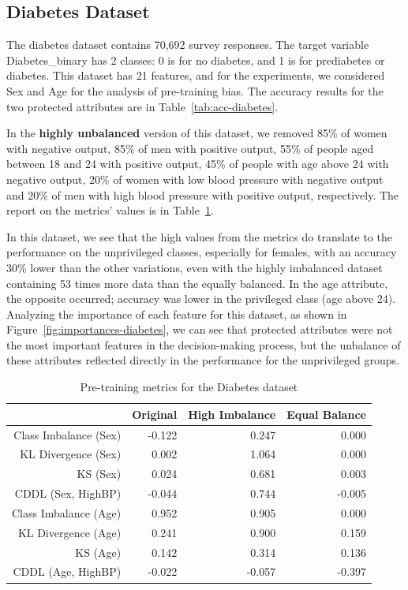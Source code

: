 \documentclass[12pt]{article}
\begin{document}
\subsection{Diabetes Dataset}
\label{sec:diabetes}
The diabetes dataset contains 70,692 survey responses. The target variable Diabetes\_binary has 2 classes: 0 is for no diabetes, and 1 is for prediabetes or diabetes. This dataset has 21 features, and for the experiments, we considered Sex and Age for the analysis of pre-training bias. The accuracy results for the two protected attributes are in Table~\ref{tab:acc-diabetes}.

In the \textbf{highly unbalanced} version of this dataset, we removed 85\% of women with negative output, 85\% of men with positive output, 55\% of people aged between 18 and 24 with positive output, 45\% of people with age above 24 with negative output, 20\% of women with low blood pressure with negative output and 20\% of men with high blood pressure with positive output, respectively. The report on the metrics' values is in Table~\ref{tab:metrics-diabetes}.

In this dataset, we see that the high values from the metrics do translate to the performance on the unprivileged classes, especially for females, with an accuracy 30\% lower than the other variations, even with the highly imbalanced dataset containing 53 times more data than the equally balanced. In the age attribute, the opposite occurred; accuracy was lower in the privileged class (age above 24). Analyzing the importance of each feature for this dataset, as shown in Figure~\ref{fig:importances-diabetes}, we can see that protected attributes were not the most important features in the decision-making process, but the unbalance of these attributes reflected directly in the performance for the unprivileged groups.

\begin{table}[ht]
\centering
\begin{tabular}{@{}rrrr@{}}
\toprule
                      & Original & High Imbalance & Equal Balance \\ \midrule
Class Imbalance (Sex) & -0.122   & 0.247          & 0.000         \\
KL Divergence (Sex)   & 0.002    & 1.064          & 0.000         \\
KS (Sex)              & 0.024    & 0.681          & 0.003         \\
CDDL (Sex, HighBP)    & -0.044   & 0.744          & -0.005        \\
Class Imbalance (Age) & 0.952    & 0.905          & 0.000         \\
KL Divergence (Age)   & 0.241    & 0.900          & 0.159         \\
KS (Age)              & 0.142    & 0.314          & 0.136         \\
CDDL (Age, HighBP)    & -0.022   & -0.057         & -0.397        \\ \bottomrule
\end{tabular}
\caption{Pre-training metrics for the Diabetes dataset}
\label{tab:metrics-diabetes}
\end{table}
\end{document}
